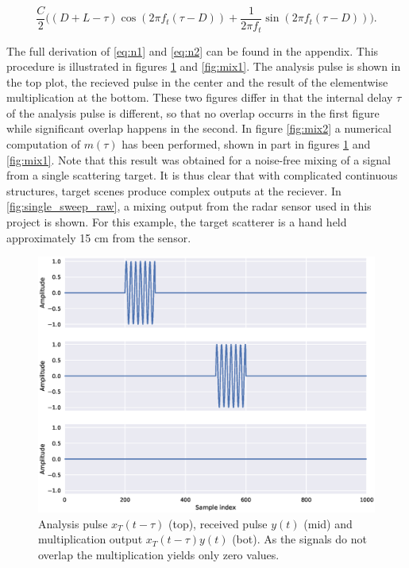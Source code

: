 \begin{equation}\label{eq:n2}
	\frac{C}{2}\Big((D + L - \tau)\cos(2\pi f_t(\tau - D)) 
	+ \frac{1}{2\pi f_t}\sin(2\pi f_t(\tau - D))\Big).
\end{equation}

The full derivation of \ref{eq:n1} and \ref{eq:n2} can be found in the appendix. This procedure is illustrated in figures \ref{fig:mix0} and \ref{fig:mix1}. The analysis pulse is shown in the top plot, the recieved pulse in the center and the result of the elementwise multiplication at the bottom. These two figures differ in that the internal delay $\tau$ of the analysis pulse is different, so that no overlap occurrs in the first figure while significant overlap happens in the second. In figure \ref{fig:mix2} a numerical computation of $m(\tau)$ has been performed, shown in part in figures \ref{fig:mix0} and \ref{fig:mix1}. Note that this result was obtained for a noise-free mixing of a signal from a single scattering target. It is thus clear that with complicated continuous structures, target scenes produce complex outputs at the reciever. In \ref{fig:single_sweep_raw}, a mixing output from the radar sensor used in this project is shown. For this example, the target scatterer is a hand held approximately 15 cm from the sensor. 

\begin{figure}[h]
	\centering
	\includegraphics[scale=0.5]{figs_temp/mixing0}
	\caption{Analysis pulse $x_T(t-\tau)$ (top), received pulse $y(t)$ (mid) and multiplication output $x_T(t-\tau)y(t)$ (bot). As the signals do not overlap the multiplication yields only zero values.}
	\label{fig:mix0}
\end{figure}

